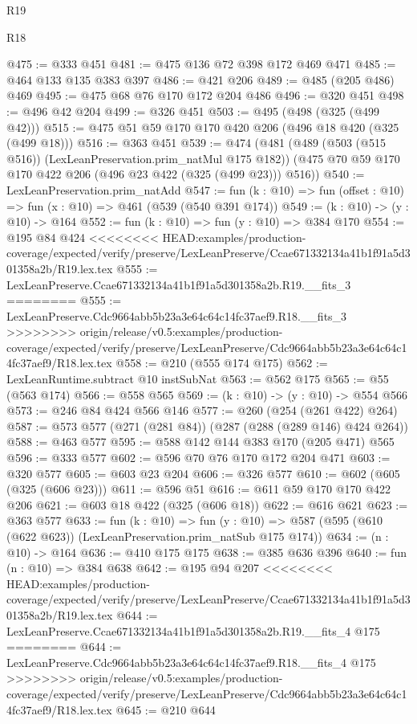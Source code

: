 \begin{lexlean}{R19}
\begin{lexlean}{R18}
\begin{coremodule}
{{{{{{{{{{{{{@475 := @333 @451
@481 := @475 @136 @72 @398 @172 @469 @471
@485 := @464 @133 @135 @383 @397
@486 := @421 @206
@489 := @485 (@205 @486) @469
@495 := @475 @68 @76 @170 @172 @204 @486
@496 := @320 @451
@498 := @496 @42 @204
@499 := @326 @451
@503 := @495 (@498 (@325 (@499 @42)))
@515 := @475 @51 @59 @170 @170 @420 @206 (@496 @18 @420 (@325 (@499 @18)))
@516 := @363 @451
@539 := @474
    (@481
      (@489 (@503 (@515 @516)) (LexLeanPreservation.prim_natMul @175 @182))
      (@475 @70 @59 @170 @170 @422 @206 (@496 @23 @422 (@325 (@499 @23))) @516))
@540 := LexLeanPreservation.prim_natAdd
@547 := fun (k : @10) => fun (offset : @10) => fun (x : @10) => @461 (@539 (@540 @391 @174))
@549 := (k : @10) -> (y : @10) -> @164
@552 := fun (k : @10) => fun (y : @10) => @384 @170
@554 := @195 @84 @424
<<<<<<<< HEAD:examples/production-coverage/expected/verify/preserve/LexLeanPreserve/Ccae671332134a41b1f91a5d301358a2b/R19.lex.tex
@555 := LexLeanPreserve.Ccae671332134a41b1f91a5d301358a2b.R19.__fits_3
========
@555 := LexLeanPreserve.Cdc9664abb5b23a3e64c64c14fc37aef9.R18.__fits_3
>>>>>>>> origin/release/v0.5:examples/production-coverage/expected/verify/preserve/LexLeanPreserve/Cdc9664abb5b23a3e64c64c14fc37aef9/R18.lex.tex
@558 := @210 (@555 @174 @175)
@562 := LexLeanRuntime.subtract @10 instSubNat
@563 := @562 @175
@565 := @55 (@563 @174)
@566 := @558 @565
@569 := (k : @10) -> (y : @10) -> @554 @566
@573 := @246 @84 @424 @566 @146
@577 := @260 (@254 (@261 @422) @264)
@587 := @573 @577 (@271 (@281 @84)) (@287 (@288 (@289 @146) @424 @264))
@588 := @463 @577
@595 := @588 @142 @144 @383 @170 (@205 @471) @565
@596 := @333 @577
@602 := @596 @70 @76 @170 @172 @204 @471
@603 := @320 @577
@605 := @603 @23 @204
@606 := @326 @577
@610 := @602 (@605 (@325 (@606 @23)))
@611 := @596 @51
@616 := @611 @59 @170 @170 @422 @206
@621 := @603 @18 @422 (@325 (@606 @18))
@622 := @616 @621
@623 := @363 @577
@633 := fun (k : @10) =>
  fun (y : @10) => @587 (@595 (@610 (@622 @623)) (LexLeanPreservation.prim_natSub @175 @174))
@634 := (n : @10) -> @164
@636 := @410 @175 @175
@638 := @385 @636 @396
@640 := fun (n : @10) => @384 @638
@642 := @195 @94 @207
<<<<<<<< HEAD:examples/production-coverage/expected/verify/preserve/LexLeanPreserve/Ccae671332134a41b1f91a5d301358a2b/R19.lex.tex
@644 := LexLeanPreserve.Ccae671332134a41b1f91a5d301358a2b.R19.__fits_4 @175
========
@644 := LexLeanPreserve.Cdc9664abb5b23a3e64c64c14fc37aef9.R18.__fits_4 @175
>>>>>>>> origin/release/v0.5:examples/production-coverage/expected/verify/preserve/LexLeanPreserve/Cdc9664abb5b23a3e64c64c14fc37aef9/R18.lex.tex
@645 := @210 @644
}}}}}}}}}}}}}
\end{coremodule}
\end{lexlean}
\end{lexlean}
